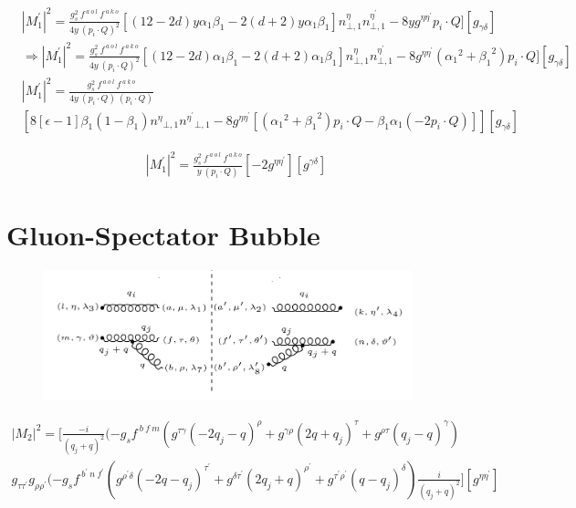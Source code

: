 \begin{equation}
\begin{split}
&{|{M}^{\prime}_1|}^2 =\frac{g_s^2 \:f^{\:a\:o\:l}\: f^{\:a\:k\:o}}{4y\:(p_i\cdot Q)^2} 
[(12-2d)y\alpha_1\beta_1-2(d+2)y\alpha_1\beta_1] {n}^{{\eta}}_{\bot,1}{n}^{{\eta}^{\prime}}_{\bot,1}-8yg^{{\eta}{{\eta}^{\prime}}} p_i \cdot Q][g_{{\gamma}{{\delta}}}]\\
&\Rightarrow {|{M}^{\prime}_1|}^2 =\frac{g_s^2 \:f^{\:a\:o\:l}\: f^{\:a\:k\:o}}{4y\:(p_i\cdot Q)^2} 
[(12-2d)\alpha_1\beta_1-2(d+2)\alpha_1\beta_1] {n}^{{\eta}}_{\bot,1}{n}^{{\eta}^{\prime}}_{\bot,1}
-8g^{{\eta}{{\eta}^{\prime}}}({\alpha_1}^2+{\beta_1}^2) p_i \cdot Q][g_{{\gamma}{{\delta}}}]\\
& {|{M}^{\prime}_1|}^2 =\frac{g_s^2 \:f^{\:a\:o\:l}\: f^{\:a\:k\:o}}{4y\:(p_i\cdot Q) \:(p_i\cdot Q)}\\
&[8[\epsilon-1]{\beta_1}(1-\beta_1){n^{{\eta}}}_{\bot,1}{n^{{\eta}^{\prime}}}_{\bot,1}-8g^{{\eta}{{\eta}^{\prime}}}[({\alpha_1}^2+{\beta_1}^2) p_i \cdot Q - {\beta_1} \alpha_1(-2p_i \cdot Q)]][g_{{\gamma}{{\delta}}}]
\end{split}
\end{equation}


\begin{equation}
\begin{split}
{|{M}^{\prime}_1|}^2 =\frac{g_s^2 \:f^{\:a\:o\:l}\: f^{\:a\:k\:o}}{y\:(p_i\cdot Q)}[-2g^{{\eta}{{\eta}^{\prime}}}][g^{{\gamma}{{\delta}}}]
\end{split}
\end{equation}

\pagebreak
\section{Gluon-Spectator Bubble}
\begin{figure}[ht!]
\centering
\includegraphics[width=0.95\textwidth]{images/GG/M2Squer}
\end{figure}
\begin{equation}
\begin{split}
|M_2|^2=[\frac{-i}{(q_j +q)^2}(-g_s f^{\:b\:f\:m}(g^{{\tau}{\gamma}}(-2q_j-q)^{\rho}+g^{{\gamma}{\rho}}(2q +q_j)^{\tau}+g^{{\rho}{\tau}}(q_j -q)^{\gamma})\\g_{{\tau}{{\tau}^{\prime}}}g_{{\rho}{{\rho}^{\prime}}}
(-g_s f^{\:b^{\prime}\:n\:f^{\prime}}(g^{{{\rho}^{\prime}}{{\delta}}}(-2q-q_j)^{{\tau}^{\prime}}+g^{{{\delta}}{{\tau}^{\prime}}}(2q_j +q)^{{\rho}^{\prime}}+g^{{{\tau}^{\prime}}{{\rho}^{\prime}}}(q-q_j)^{{\delta}})\frac{i}{(q_j +q)^2}][g^{{\eta}{{\eta}^{\prime}}}]
\end{split}
\end{equation}

